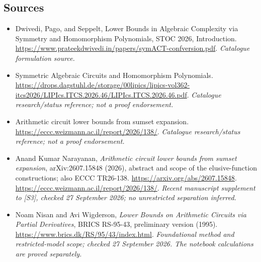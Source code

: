 \documentclass[11pt,a4paper]{article}
\numberwithin{equation}{section}
\begin{document}
\subsection{Sources}
\begin{itemize}\raggedright
\item[\textnormal{[S1]}]\hypertarget{source:30001375:1}{} Dwivedi, Pago, and Seppelt, Lower Bounds in Algebraic Complexity via Symmetry and Homomorphism Polynomials, STOC 2026, Introduction.
\url{https://www.prateekdwivedi.in/papers/symACT-confversion.pdf}.
{\small\textit{Catalogue formulation source.}}
\item[\textnormal{[S2]}]\hypertarget{source:30001375:2}{} Symmetric Algebraic Circuits and Homomorphism Polynomials.
\url{https://drops.dagstuhl.de/storage/00lipics/lipics-vol362-itcs2026/LIPIcs.ITCS.2026.46/LIPIcs.ITCS.2026.46.pdf}.
{\small\textit{Catalogue research/status reference; not a proof endorsement.}}
\item[\textnormal{[S3]}]\hypertarget{source:30001375:3}{} Arithmetic circuit lower bounds from sumset expansion.
\url{https://eccc.weizmann.ac.il/report/2026/138/}.
{\small\textit{Catalogue research/status reference; not a proof endorsement.}}
\item[\textnormal{[E1]}]\hypertarget{extra:30001375:1}{} Anand Kumar Narayanan,
\emph{Arithmetic circuit lower bounds from sumset expansion},
arXiv:2607.15848 (2026), abstract and scope of the elusive-function
constructions; also ECCC TR26-138.
\url{https://arxiv.org/abs/2607.15848}.
\url{https://eccc.weizmann.ac.il/report/2026/138/}.
{\small\textit{Recent manuscript supplement to [S3], checked
27 September 2026; no unrestricted separation inferred.}}
\item[\textnormal{[E2]}]\hypertarget{extra:30001375:2}{} Noam Nisan and
Avi Wigderson, \emph{Lower Bounds on Arithmetic Circuits via Partial
Derivatives}, BRICS RS-95-43, preliminary version (1995).
\url{https://www.brics.dk/RS/95/43/index.html}.
{\small\textit{Foundational method and restricted-model scope; checked
27 September 2026. The notebook calculations are proved separately.}}

\end{itemize}

\end{document}
